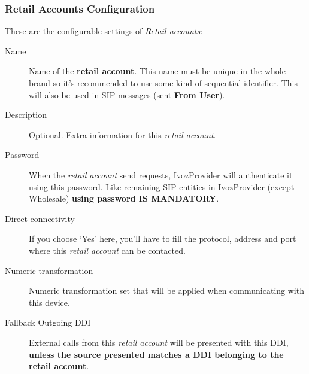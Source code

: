 \documentclass[letterpaper,10pt,english]{sphinxmanual}
\begin{document}
\subsubsection{Retail Accounts Configuration}
\label{administration_portal/client/retail/retail_accounts:retail-accounts-configuration}
These are the configurable settings of \emph{Retail accounts}:
\begin{description}
\item[{Name}] \leavevmode{}\label{administration_portal/client/retail/retail_accounts:term-name}
Name of the \textbf{retail account}. This name must be unique in the whole brand so
it's recommended to use some kind of sequential identifier. This will also be used
in SIP messages (sent \textbf{From User}).

\item[{Description}] \leavevmode{}\label{administration_portal/client/retail/retail_accounts:term-description}
Optional. Extra information for this \emph{retail account}.

\item[{Password}] \leavevmode{}\label{administration_portal/client/retail/retail_accounts:term-password}
When the \emph{retail account} send requests, IvozProvider will authenticate it using
this password. Like remaining SIP entities in IvozProvider (except Wholesale) \textbf{using password IS MANDATORY}.

\item[{Direct connectivity}] \leavevmode{}\label{administration_portal/client/retail/retail_accounts:term-direct-connectivity}
If you choose `Yes' here, you'll have to fill the protocol, address and
port where this \emph{retail account} can be contacted.

\item[{Numeric transformation}] \leavevmode{}\label{administration_portal/client/retail/retail_accounts:term-numeric-transformation}
Numeric transformation set that will be applied when communicating with this device.

\item[{Fallback Outgoing DDI}] \leavevmode{}\label{administration_portal/client/retail/retail_accounts:term-fallback-outgoing-ddi}
External calls from this \emph{retail account} will be presented with this DDI, \textbf{unless
the source presented matches a DDI belonging to the retail account}.


\end{description}
\end{document}
